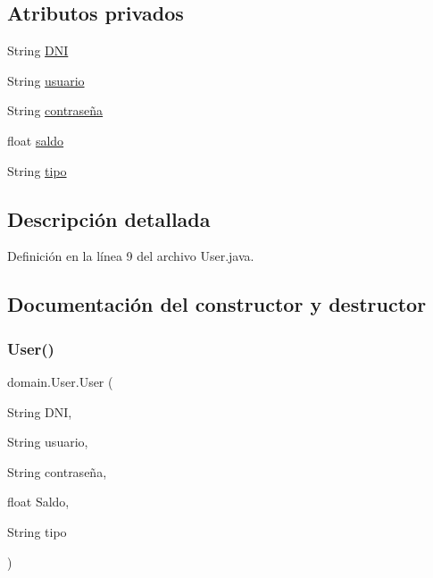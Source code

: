 \subsection*{Atributos privados}
\begin{DoxyCompactItemize}
\item 
String \mbox{\hyperlink{classdomain_1_1User_a9f89fcc3016d3a74f4660f1e3c133882}{D\+NI}}
\item 
String \mbox{\hyperlink{classdomain_1_1User_a3039c018dafefc6ce963346e58f80fe6}{usuario}}
\item 
String \mbox{\hyperlink{classdomain_1_1User_aaa44e4ca80b63275a62812ab55808fb0}{contraseña}}
\item 
float \mbox{\hyperlink{classdomain_1_1User_abfe10a19b15929745bc34610db010938}{saldo}}
\item 
String \mbox{\hyperlink{classdomain_1_1User_a3e3d2bcaf19448f31142d301db0493be}{tipo}}
\end{DoxyCompactItemize}


\subsection{Descripción detallada}


Definición en la línea 9 del archivo User.\+java.



\subsection{Documentación del constructor y destructor}
\mbox{\label{classdomain_1_1User_abffd907e53fb2c2c2d97c8c7688fd4a4}} 
\subsubsection{\texorpdfstring{User()}{User()}}
{\footnotesize\ttfamily domain.\+User.\+User (\begin{DoxyParamCaption}\item[{String}]{D\+NI,  }\item[{String}]{usuario,  }\item[{String}]{contraseña,  }\item[{float}]{Saldo,  }\item[{String}]{tipo }\end{DoxyParamCaption})}



